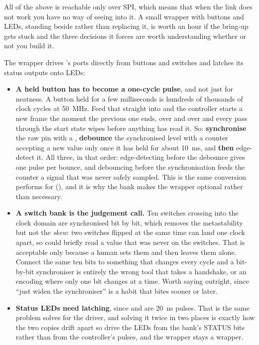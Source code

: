 All of the above is reachable only over SPI, which means that when the link does not work you have no
way of seeing into it. A small wrapper with buttons and LEDs, standing beside 
rather than replacing it, is worth an hour if the bring-up gets stuck \textemdash{} and the three
decisions it forces are worth understanding whether or not you build it.

The wrapper drives 's ports directly from buttons and switches and latches its
status outputs onto LEDs:


\begin{itemize}
  \item \textbf{A held button has to become a one-cycle pulse}, and not just for neatness. A button
    held for a few milliseconds is hundreds of thousands of clock cycles at 50~MHz. Feed that straight
    into  and the controller starts a new frame the moment the previous one ends, over
    and over \textemdash{} and every pass through the start state wipes  before anything
    has read it. So: \textbf{synchronise} the raw pin with a , \textbf{debounce} the
    synchronised level with a counter accepting a new value only once it has held for about 10~ms, and
    \textbf{then} edge-detect it. All three, in that order: edge-detecting before the debounce gives
    one pulse per bounce, and debouncing before the synchronisation feeds the counter a signal that
    was never safely sampled. This is the same conversion  performs for
     (), and it is why the bank makes the wrapper optional rather than
    necessary.
  \item \textbf{A switch bank is the judgement call.} Ten switches crossing into the clock domain are
    synchronised bit by bit, which removes the metastability but not the \emph{skew}: two switches
    flipped at the same time can land one clock apart, so  could briefly read a value that
    was never on the switches. That is acceptable only because a human sets them and then leaves them
    alone. Connect the same ten bits to something that changes every cycle and a bit-by-bit
    synchroniser is entirely the wrong tool \textemdash{} that takes a handshake, or an encoding where
    only one bit changes at a time. Worth saying outright, since ``just widen the synchroniser'' is a
    habit that bites sooner or later.
  \item \textbf{Status LEDs need latching}, since  and  are 20~ns pulses.
    That is the same problem  solves for the driver, and solving it twice in two
    places is exactly how the two copies drift apart \textemdash{} so drive the LEDs from the bank's
    STATUS bits rather than from the controller's pulses, and the wrapper stays a wrapper.
\end{itemize}

